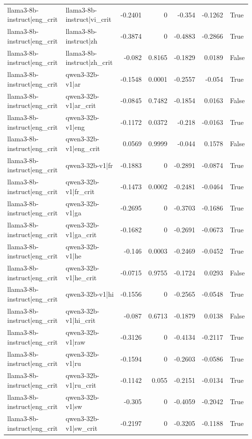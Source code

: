 \begin{table}
\begin{tabular}{l l r r r r l}
llama3-8b-instruct|eng_crit & llama3-8b-instruct|vi_crit & -0.2401 & 0 & -0.354 & -0.1262 & True \\
llama3-8b-instruct|eng_crit & llama3-8b-instruct|zh & -0.3874 & 0 & -0.4883 & -0.2866 & True \\
llama3-8b-instruct|eng_crit & llama3-8b-instruct|zh_crit & -0.082 & 0.8165 & -0.1829 & 0.0189 & False \\
llama3-8b-instruct|eng_crit & qwen3-32b-v1|ar & -0.1548 & 0.0001 & -0.2557 & -0.054 & True \\
llama3-8b-instruct|eng_crit & qwen3-32b-v1|ar_crit & -0.0845 & 0.7482 & -0.1854 & 0.0163 & False \\
llama3-8b-instruct|eng_crit & qwen3-32b-v1|eng & -0.1172 & 0.0372 & -0.218 & -0.0163 & True \\
llama3-8b-instruct|eng_crit & qwen3-32b-v1|eng_crit & 0.0569 & 0.9999 & -0.044 & 0.1578 & False \\
llama3-8b-instruct|eng_crit & qwen3-32b-v1|fr & -0.1883 & 0 & -0.2891 & -0.0874 & True \\
llama3-8b-instruct|eng_crit & qwen3-32b-v1|fr_crit & -0.1473 & 0.0002 & -0.2481 & -0.0464 & True \\
llama3-8b-instruct|eng_crit & qwen3-32b-v1|ga & -0.2695 & 0 & -0.3703 & -0.1686 & True \\
llama3-8b-instruct|eng_crit & qwen3-32b-v1|ga_crit & -0.1682 & 0 & -0.2691 & -0.0673 & True \\
llama3-8b-instruct|eng_crit & qwen3-32b-v1|he & -0.146 & 0.0003 & -0.2469 & -0.0452 & True \\
llama3-8b-instruct|eng_crit & qwen3-32b-v1|he_crit & -0.0715 & 0.9755 & -0.1724 & 0.0293 & False \\
llama3-8b-instruct|eng_crit & qwen3-32b-v1|hi & -0.1556 & 0 & -0.2565 & -0.0548 & True \\
llama3-8b-instruct|eng_crit & qwen3-32b-v1|hi_crit & -0.087 & 0.6713 & -0.1879 & 0.0138 & False \\
llama3-8b-instruct|eng_crit & qwen3-32b-v1|raw & -0.3126 & 0 & -0.4134 & -0.2117 & True \\
llama3-8b-instruct|eng_crit & qwen3-32b-v1|ru & -0.1594 & 0 & -0.2603 & -0.0586 & True \\
llama3-8b-instruct|eng_crit & qwen3-32b-v1|ru_crit & -0.1142 & 0.055 & -0.2151 & -0.0134 & True \\
llama3-8b-instruct|eng_crit & qwen3-32b-v1|sw & -0.305 & 0 & -0.4059 & -0.2042 & True \\
llama3-8b-instruct|eng_crit & qwen3-32b-v1|sw_crit & -0.2197 & 0 & -0.3205 & -0.1188 & True \\

\end{tabular}
\end{table}
